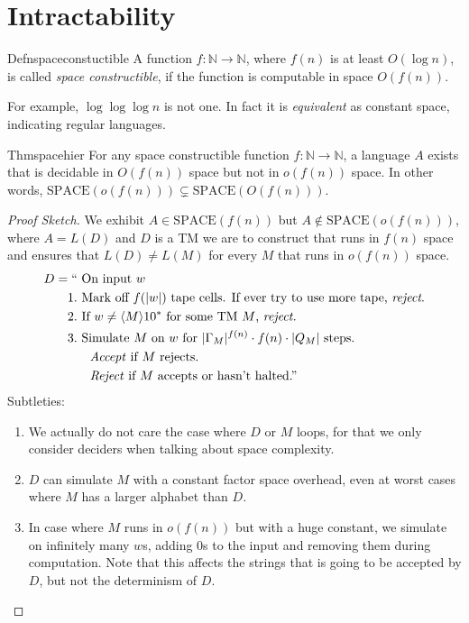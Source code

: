 \chapter{Intractability}

\begin{reference}{Defn}{spaceconstuctible}
  A function $f:\mathbb N\to \mathbb N$, where $f(n)$ is at least $O(\log n)$, is called \emph{space constructible}, if the function is computable in space $O(f(n))$.
\end{reference}

For example, $\log\log\log n$ is not one. In fact it is \textit{equivalent} as constant space, indicating regular languages.

\begin{reference}{Thm}{spacehier}
  For any space constructible function $f:\mathbb N\to \mathbb N$, a language $A$ exists that is decidable in $O(f(n))$ space but not in $o(f(n))$ space. In other words, $\mathrm{SPACE}(o(f(n)))\subsetneq \mathrm{SPACE}(O(f(n)))$.
\end{reference}

\begin{proof}[Proof Sketch]
  We exhibit $A\in \mathrm{SPACE}(f(n))$ but $A\notin \mathrm{SPACE}(o(f(n)))$, where $A=L(D)$ and $D$ is a TM we are to construct that runs in $f(n)$ space and ensures that $L(D)\neq L(M)$ for every $M$ that runs in $o(f(n))$ space.
  \begin{align*}
    D={``} & \text{ On input }w                                                                   \\
    1.     & \text{ Mark off $f(|w|)$ tape cells. If ever try to use more tape, \textit{reject}.} \\
    2.     & \text{ If $w\neq \langle M\rangle10^*$ for some TM $M$, \textit{reject.}}            \\
    3.     & \text{ Simulate $M$ on $w$ for $|\Gamma_M|^{f(n)}\cdot f(n)\cdot|Q_M|$ steps.}       \\
           & \quad\text{\textit{Accept} if $M$ rejects.}                                          \\
           & \quad\text{\textit{Reject} if $M$ accepts or hasn't halted.''}
  \end{align*}
  Subtleties:
  \begin{enumerate}
    \item We actually do not care the case where $D$ or $M$ loops, for that we only consider deciders when talking about space complexity.
    \item $D$ can simulate $M$ with a constant factor space overhead, even at worst cases where $M$ has a larger alphabet than $D$.
    \item In case where $M$ runs in $o(f(n))$ but with a huge constant, we simulate on infinitely many $w$s, adding 0s to the input and removing them during computation. Note that this affects the strings that is going to be accepted by $D$, but not the determinism of $D$.\qedhere
  \end{enumerate}
\end{proof}

